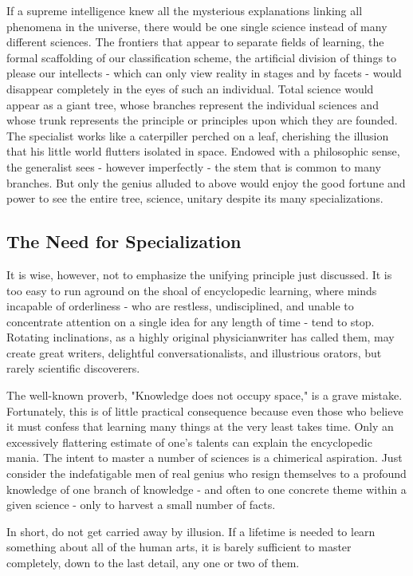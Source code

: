 \documentclass{article}
\begin{document}
If a supreme intelligence knew all the mysterious explanations linking all phenomena in the universe, there would be one single science instead of many different sciences. The frontiers that appear to separate fields of learning, the formal scaffolding of our classification scheme, the artificial division of things to please our intellects - which can only view reality in stages and by facets - would disappear completely in the eyes of such an individual. Total science would appear as a giant tree, whose branches represent the individual sciences and whose trunk represents the principle or principles upon which they are founded. The specialist works like a caterpiller perched on a leaf, cherishing the illusion that his little world flutters isolated in space. Endowed with a philosophic sense, the generalist sees - however imperfectly - the stem that is common to many branches. But only the genius alluded to above would enjoy the good fortune and power to see the entire tree, science, unitary despite its many specializations.

\subsection*{The Need for Specialization}

It is wise, however, not to emphasize the unifying principle just discussed. It is too easy to run aground on the shoal of encyclopedic learning, where minds incapable of orderliness - who are restless, undisciplined, and unable to concentrate attention on a single idea for any length of time - tend to stop. Rotating inclinations, as a highly original physicianwriter has called them, may create great writers, delightful conversationalists, and illustrious orators, but rarely scientific discoverers.

The well-known proverb, "Knowledge does not occupy space," is a grave mistake. Fortunately, this is of little practical consequence because even those who believe it must confess that learning many things at the very least takes time. Only an excessively flattering estimate of one’s talents can explain the encyclopedic mania. The intent to master a number of sciences is a chimerical aspiration. Just consider the indefatigable men of real genius who resign themselves to a profound knowledge of one branch of knowledge - and often to one concrete theme within a given science - only to harvest a small number of facts.

In short, do not get carried away by illusion. If a lifetime is needed to learn something about all of the human arts, it is barely sufficient to master completely, down to the last detail, any one or two of them.
\end{document}
